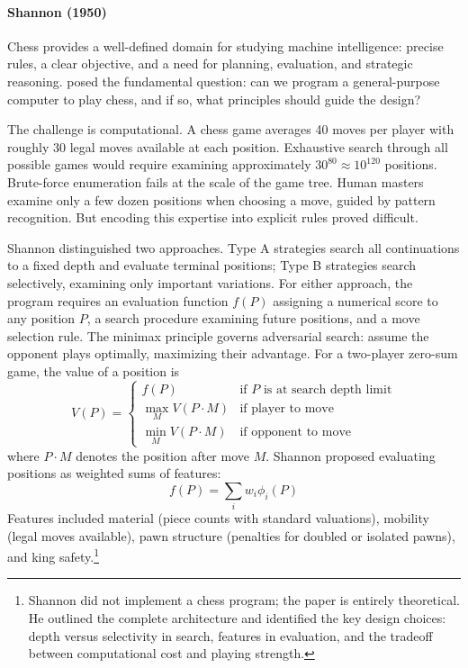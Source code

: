 \paragraph{Shannon (1950)}

Chess provides a well-defined domain for studying machine intelligence: precise rules, a clear objective, and a need for planning, evaluation, and strategic reasoning. \citet{Shannon1950} posed the fundamental question: can we program a general-purpose computer to play chess, and if so, what principles should guide the design?

The challenge is computational. A chess game averages 40 moves per player with roughly 30 legal moves available at each position. Exhaustive search through all possible games would require examining approximately $30^{80} \approx 10^{120}$ positions. Brute-force enumeration fails at the scale of the game tree. Human masters examine only a few dozen positions when choosing a move, guided by pattern recognition. But encoding this expertise into explicit rules proved difficult.

Shannon distinguished two approaches. Type A strategies search all continuations to a fixed depth and evaluate terminal positions; Type B strategies search selectively, examining only important variations. For either approach, the program requires an evaluation function $f(P)$ assigning a numerical score to any position $P$, a search procedure examining future positions, and a move selection rule. The minimax principle governs adversarial search: assume the opponent plays optimally, maximizing their advantage. For a two-player zero-sum game, the value of a position is
\begin{equation}
V(P) = \begin{cases}
f(P) & \text{if } P \text{ is at search depth limit} \\
\max_{M} V(P \cdot M) & \text{if player to move} \\
\min_{M} V(P \cdot M) & \text{if opponent to move}
\end{cases}
\end{equation}
where $P \cdot M$ denotes the position after move $M$. Shannon proposed evaluating positions as weighted sums of features:
\begin{equation}
f(P) = \sum_i w_i \phi_i(P)
\end{equation}
Features included material (piece counts with standard valuations), mobility (legal moves available), pawn structure (penalties for doubled or isolated pawns), and king safety.\footnote{Shannon did not implement a chess program; the paper is entirely theoretical. He outlined the complete architecture and identified the key design choices: depth versus selectivity in search, features in evaluation, and the tradeoff between computational cost and playing strength.}

